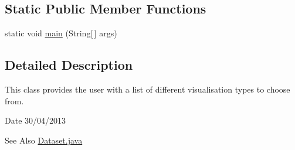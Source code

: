 \subsection*{Static Public Member Functions}
\begin{DoxyCompactItemize}
\item 
static void \hyperlink{class_viz_type_j_panel_aac218445a0f5192f93b9e5d034d4cf71}{main} (String\mbox{[}$\,$\mbox{]} args)
\end{DoxyCompactItemize}


\subsection{Detailed Description}
This class provides the user with a list of different visualisation types to choose from. 

\begin{DoxyDate}{Date}
30/04/2013 
\end{DoxyDate}
\begin{DoxySeeAlso}{See Also}
\hyperlink{_dataset_8java}{Dataset.\-java} 
\end{DoxySeeAlso}


